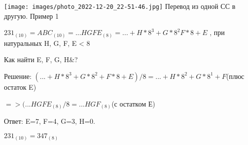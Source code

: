 \documentclass{beamer}
\begin{document}
\texttt{[image: images/photo\_2022-12-20\_22-51-46.jpg]} \Large{\color{blue}П\color{black}еревод из одной СС в другую. Пример 1 }
\begin{center}
    
\begin{math}
    231_{(10)} = ABC_{(10)} = ...HGFE_{(8)} = ...+ H*8^3 + G*8^2 F*8 + E
\end{math}
, при натуральных H, G, F, E < 8

\color{teal}Как найти E, F, G, H&?

\color{black}
Решение: \begin{math}
    (...+ H*8^3 + G*8^2 + F*8 + E)/8 = ...+ H*8^2 + G * 8^1 + F  
\end{math}(плюс остаток E) 

\begin{math}
    => (...HGFE_{(8)}/8 = ...HGF_{(8)}
\end{math}(с остатком Е)

\hspace{10}


\hspace{10}


\color{teal}Ответ: \color{black} E=7, F=4, G=3, H=0.

\begin{math}
    231_{(10)} = 347_{(8)}
\end{math}
\end{center}
\end{document}
